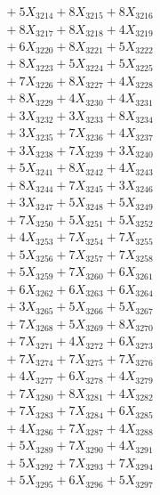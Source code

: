 \documentclass[a4paper,10pt]{article}
\begin{document}
{\begin{align}
&\;  + 5 X_{3214} + 8 X_{3215} + 8 X_{3216} \\[0.3ex]
&\;  + 8 X_{3217} + 8 X_{3218} + 4 X_{3219} \\[0.5ex]\allowbreak
&\;  + 6 X_{3220} + 8 X_{3221} + 5 X_{3222} \\[0.3ex]
&\;  + 8 X_{3223} + 5 X_{3224} + 5 X_{3225} \\[0.3ex]
&\;  + 7 X_{3226} + 8 X_{3227} + 4 X_{3228} \\[0.3ex]
&\;  + 8 X_{3229} + 4 X_{3230} + 4 X_{3231} \\[0.3ex]
&\;  + 3 X_{3232} + 3 X_{3233} + 8 X_{3234} \\[0.3ex]
&\;  + 3 X_{3235} + 7 X_{3236} + 4 X_{3237} \\[0.3ex]
&\;  + 3 X_{3238} + 7 X_{3239} + 3 X_{3240} \\[0.3ex]
&\;  + 5 X_{3241} + 8 X_{3242} + 4 X_{3243} \\[0.3ex]
&\;  + 8 X_{3244} + 7 X_{3245} + 3 X_{3246} \\[0.3ex]
&\;  + 3 X_{3247} + 5 X_{3248} + 5 X_{3249} \\[0.5ex]\allowbreak
&\;  + 7 X_{3250} + 5 X_{3251} + 5 X_{3252} \\[0.3ex]
&\;  + 4 X_{3253} + 7 X_{3254} + 7 X_{3255} \\[0.3ex]
&\;  + 5 X_{3256} + 7 X_{3257} + 7 X_{3258} \\[0.3ex]
&\;  + 5 X_{3259} + 7 X_{3260} + 6 X_{3261} \\[0.3ex]
&\;  + 6 X_{3262} + 6 X_{3263} + 6 X_{3264} \\[0.3ex]
&\;  + 3 X_{3265} + 5 X_{3266} + 5 X_{3267} \\[0.3ex]
&\;  + 7 X_{3268} + 5 X_{3269} + 8 X_{3270} \\[0.3ex]
&\;  + 7 X_{3271} + 4 X_{3272} + 6 X_{3273} \\[0.3ex]
&\;  + 7 X_{3274} + 7 X_{3275} + 7 X_{3276} \\[0.3ex]
&\;  + 4 X_{3277} + 6 X_{3278} + 4 X_{3279} \\[0.5ex]\allowbreak
&\;  + 7 X_{3280} + 8 X_{3281} + 4 X_{3282} \\[0.3ex]
&\;  + 7 X_{3283} + 7 X_{3284} + 6 X_{3285} \\[0.3ex]
&\;  + 4 X_{3286} + 7 X_{3287} + 4 X_{3288} \\[0.3ex]
&\;  + 5 X_{3289} + 7 X_{3290} + 4 X_{3291} \\[0.3ex]
&\;  + 5 X_{3292} + 7 X_{3293} + 7 X_{3294} \\[0.3ex]
&\;  + 5 X_{3295} + 6 X_{3296} + 5 X_{3297} \\[0.3ex]

\end{align}}
\end{document}

